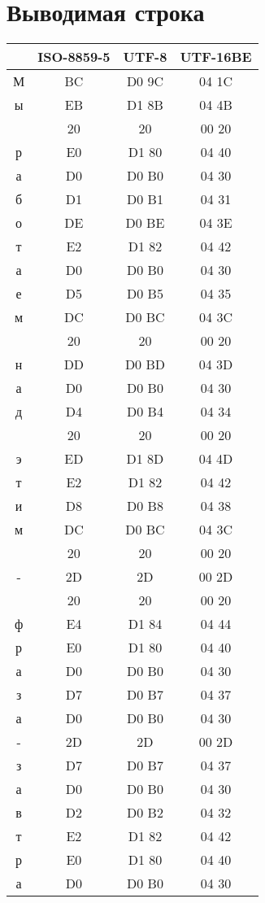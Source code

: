 \section{Выводимая строка}
\begin{center}
\begin{tabular}{|c|c|c|c|}
\hline
 & ISO-8859-5 & UTF-8 & UTF-16BE\\
\hline
М & BC & D0 9C & 04 1C\\
ы & EB & D1 8B & 04 4B\\
& 20 & 20 & 00 20\\
р & E0 & D1 80 & 04 40\\
а & D0 & D0 B0 & 04 30\\
б & D1 & D0 B1 & 04 31\\
о & DE & D0 BE & 04 3E\\
т & E2 & D1 82 & 04 42\\
а & D0 & D0 B0 & 04 30\\
е & D5 & D0 B5 & 04 35\\
м & DC & D0 BC & 04 3C\\
& 20 & 20 & 00 20\\
н & DD & D0 BD & 04 3D\\
а & D0 & D0 B0 & 04 30\\
д & D4 & D0 B4 & 04 34\\
& 20 & 20 & 00 20\\
э & ED & D1 8D & 04 4D\\
т & E2 & D1 82 & 04 42\\
и & D8 & D0 B8 & 04 38\\
м & DC & D0 BC & 04 3C\\
& 20 & 20 & 00 20\\
- & 2D & 2D & 00 2D\\
& 20 & 20 & 00 20\\
ф & E4 & D1 84 & 04 44\\
р & E0 & D1 80 & 04 40\\
а & D0 & D0 B0 & 04 30\\
з & D7 & D0 B7 & 04 37\\
а & D0 & D0 B0 & 04 30\\
- & 2D & 2D & 00 2D\\
з & D7 & D0 B7 & 04 37\\
а & D0 & D0 B0 & 04 30\\
в & D2 & D0 B2 & 04 32\\
т & E2 & D1 82 & 04 42\\
р & E0 & D1 80 & 04 40\\
а & D0 & D0 B0 & 04 30\\

\end{tabular}
\end{center}
